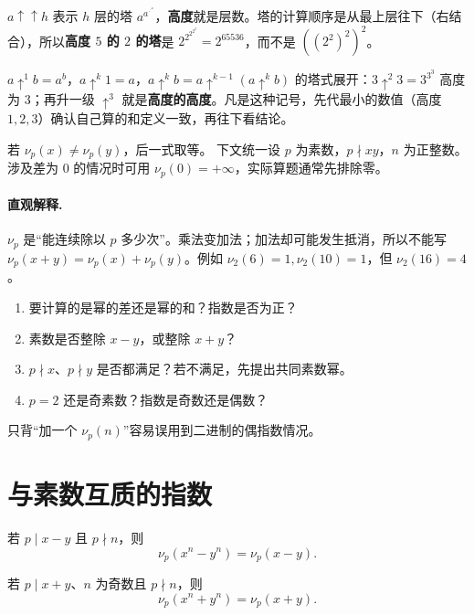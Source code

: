 \begin{tip}[幂塔与高度]
$a\uparrow\uparrow h$ 表示 $h$ 层的塔 $a^{a^{\cdot^{\cdot^a}}}$，\textbf{高度}就是层数。塔的计算顺序是从最上层往下（右结合），所以\textbf{高度 $5$ 的 $2$ 的塔}是 $2^{2^{2^{2^2}}}=2^{65536}$，而不是 $((2^2)^2)^2$。
\end{tip}

\begin{tip}[箭号记号的两条约定]
$a\uparrow^1 b=a^b$，$a\uparrow^{k}1=a$，$a\uparrow^{k}b=a\uparrow^{k-1}(a\uparrow^{k}b)$ 的塔式展开：$3\uparrow^2 3=3^{3^3}$ 高度为 $3$；再升一级 $\uparrow^3$ 就是\textbf{高度的高度}。凡是这种记号，先代最小的数值（高度 $1,2,3$）确认自己算的和定义一致，再往下看结论。
\end{tip}

若 $\nu_p(x)\ne\nu_p(y)$，后一式取等。
下文统一设 $p$ 为素数，$p\nmid xy$，$n$ 为正整数。涉及差为 $0$ 的情况时可用 $\nu_p(0)=+\infty$，实际算题通常先排除零。


\paragraph{直观解释.} $\nu_p$ 是“能连续除以 $p$ 多少次”。乘法变加法；加法却可能发生抵消，所以不能写 $\nu_p(x+y)=\nu_p(x)+\nu_p(y)$。例如 $\nu_2(6)=1,\nu_2(10)=1$，但 $\nu_2(16)=4$。
\begin{teach}
\begin{enumerate}
\item 要计算的是幂的差还是幂的和？指数是否为正？
\item 素数是否整除 $x-y$，或整除 $x+y$？
\item $p\nmid x$、$p\nmid y$ 是否都满足？若不满足，先提出共同素数幂。
\item $p=2$ 还是奇素数？指数是奇数还是偶数？
\end{enumerate}
只背“加一个 $\nu_p(n)$”容易误用到二进制的偶指数情况。
\end{teach}


\section{与素数互质的指数}
\begin{theorem}
若 $p\mid x-y$ 且 $p\nmid n$，则
\[
 \nu_p(x^n-y^n)=\nu_p(x-y).
\]



若 $p\mid x+y$、$n$ 为奇数且 $p\nmid n$，则
\[
 \nu_p(x^n+y^n)=\nu_p(x+y).
\]
\end{theorem}

